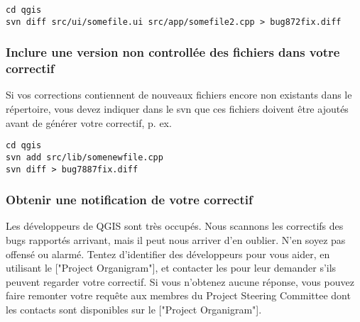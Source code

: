 \begin{verbatim}
cd qgis
svn diff src/ui/somefile.ui src/app/somefile2.cpp > bug872fix.diff
\end{verbatim}

\subsubsection{Inclure une version non controll\'ee des fichiers dans votre correctif}
Si vos corrections contiennent de nouveaux fichiers encore non existants dans le r\'epertoire, vous devez indiquer dans le svn que ces fichiers doivent \^etre ajout\'es avant de g\'en\'erer votre correctif, p. ex.

\begin{verbatim}
cd qgis
svn add src/lib/somenewfile.cpp
svn diff > bug7887fix.diff
\end{verbatim}

\subsubsection{Obtenir une notification de votre correctif}
Les d\'eveloppeurs de QGIS sont tr\`es occup\'es. Nous scannons les correctifs des bugs rapport\'es arrivant, mais il peut nous arriver d'en oublier. N'en soyez pas offens\'e ou alarm\'e. Tentez d'identifier des d\'eveloppeurs pour vous aider, en utilisant le ["Project Organigram"], et contacter les pour leur demander s’ils peuvent regarder votre correctif. Si vous n'obtenez aucune r\'eponse, vous pouvez faire remonter votre requ\^ete aux membres du Project Steering Committee dont les contacts sont disponibles sur le ["Project Organigram"].

